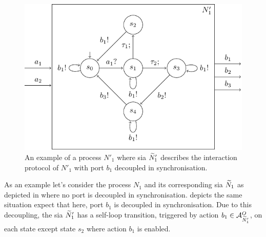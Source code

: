\begin{figure}[bht]
    \TopFigSpace
    \centering
    \includegraphics[width=12cm]{fig/sia_decoupled.pdf}
    \CaptionFigSpace
    \caption{An example of a process $N'_1$ where \gls{sia} $\widetilde{N}'_1$ describes the interaction protocol of $N'_1$ with port $b_1$ decoupled in synchronisation.}
    \label{fig_sia_decoupled}
    \BotFigSpace
\end{figure}
As an example let's consider the process $N_1$ and its corresponding \gls{sia} $\widetilde{N}_1$ as depicted in \Fig{\ref{fig_sia}} where no port is decoupled in synchronisation.
\Fig{\ref{fig_sia_decoupled}} depicts the same situation expect that here, port $b_1$ is decoupled in synchronisation.
Due to this decoupling, the \gls{sia} $\widetilde{N}'_1$ has a self-loop transition, triggered by action $b_1 \in \mathcal{A}_{\widetilde{N}'_1}^O$, on each state except state $s_2$ where action $b_1$ is enabled.

